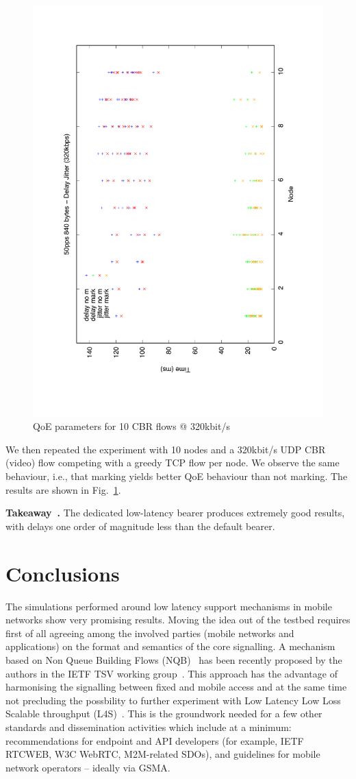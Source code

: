 \documentclass[12pt]{article}
\newcounter{takeaway}[section]
\newenvironment{takeaway}[1][]{\refstepcounter{takeaway}\par\medskip
   \noindent \textbf{Takeaway~\thetakeaway. #1} }{\medskip}
\newcommand{\reffig}[1]{Fig.~\ref{#1}}
\begin{document}
\begin{figure}[t]
  \centering
  \includegraphics[page=1,angle=270,trim=40 40 40 40,width=.6\textwidth]{images/mvideo-Mvideo-10}
  \caption{\label{fig:video-10}QoE parameters for 10 CBR flows @ 320kbit/s}
\end{figure}

We then repeated the experiment with 10 nodes and a 320kbit/s UDP CBR (video)
flow competing with a greedy TCP flow per node. We observe the same behaviour,
i.e., that marking yields better QoE behaviour than not marking. The results
are shown in \reffig{fig:video-10}.

\begin{takeaway}
  The dedicated low-latency bearer produces extremely good results, with delays
  one order of magnitude less than the default bearer.
\end{takeaway}

\section{Conclusions}
\label{S:4}

The simulations performed around low latency support mechanisms in mobile
networks show very promising results.  Moving the idea out of the testbed
requires first of all agreeing among the involved parties (mobile networks and
applications) on the format and semantics of the core signalling.  A mechanism
based on Non Queue Building Flows (NQB)~\cite{white-tsvwg-nqb-00} has been
recently proposed by the authors in the IETF TSV working
group~\cite{fossati-tsvwg-lola-00}.  This approach has the advantage of
harmonising the signalling between fixed and mobile access and at the same time
not precluding the possbility to further experiment with Low Latency Low Loss
Scalable throughput (L4S)~\cite{ietf-tsvwg-l4s-arch-03}.  This is the
groundwork needed for a few other standards and dissemination activities which
include at a minimum: recommendations for endpoint and API developers (for
example, IETF RTCWEB, W3C WebRTC, M2M-related SDOs), and guidelines for mobile
network operators -- ideally via GSMA.


\small

\end{document}
